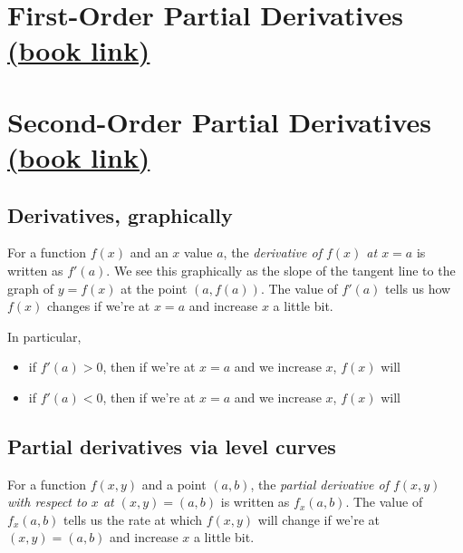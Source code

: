 \newlecture
\setcounter{section}{1}

\def\coursetopicnumber{II}
\def\topic{First-Order Partial Derivatives \& Second-Order Partial Derivatives} %
\def\shorttopic{First-, second-order partials} %
\def\textbookname{Active Calculus} %
\def\shorttextbookname{AC} %
\def\textbooksection{10.2 \& 10.3} %
\def\textbooksectionurl{https://activecalculus.org/vector/S-10-2-First-Order-Partial-Derivatives.html} %
\def\handoutday{} %


\thispagestyle{plain}
\topstuff
\section{First-Order Partial Derivatives \href{\textbooksectionurl}{(book link)}}
\section{Second-Order Partial Derivatives \href{https://activecalculus.org/vector/S-10-3-Second-Order-Partial-Derivatives.html}{(book link)}}
\setcounter{section}{2}

\subsection{Derivatives, graphically}
For a function $f(x)$ and an $x$ value $a$, the \emph{derivative of $f(x)$ at $x=a$} is written as $f'(a)$. We see this graphically as the slope of the tangent line to the graph of $y=f(x)$ at the point $(a,f(a))$. The value of $f'(a)$ tells us how $f(x)$ changes if we're at $x=a$ and increase $x$ a little bit.

In particular, 
\begin{itemize} 
    \item 
    if $f'(a)>0$, then if we're at $x=a$ and we increase $x$, $f(x)$ will \phantom{increase.}
    \item 
    if $f'(a)<0$, then if we're at $x=a$ and we increase $x$, $f(x)$ will \phantom{decrease.}
\end{itemize} 

\pagebreak 

\subsection{Partial derivatives via level curves}
For a function $f(x,y)$ and a point $(a,b)$, the \emph{partial derivative of $f(x,y)$ with respect to $x$ at $(x,y)=(a,b)$} is written as $f_x(a,b)$. The value of $f_x(a,b)$ tells us the rate at which $f(x,y)$ will change if we're at $(x,y)=(a,b)$ and increase $x$ a little bit.

